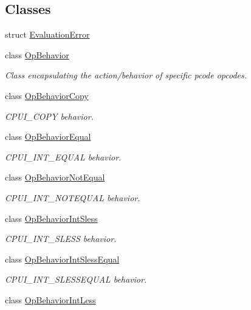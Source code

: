 \subsection*{Classes}
\begin{DoxyCompactItemize}
\item 
struct \mbox{\hyperlink{struct_evaluation_error}{Evaluation\+Error}}
\item 
class \mbox{\hyperlink{class_op_behavior}{Op\+Behavior}}
\begin{DoxyCompactList}\small\item\em Class encapsulating the action/behavior of specific pcode opcodes. \end{DoxyCompactList}\item 
class \mbox{\hyperlink{class_op_behavior_copy}{Op\+Behavior\+Copy}}
\begin{DoxyCompactList}\small\item\em C\+P\+U\+I\+\_\+\+C\+O\+PY behavior. \end{DoxyCompactList}\item 
class \mbox{\hyperlink{class_op_behavior_equal}{Op\+Behavior\+Equal}}
\begin{DoxyCompactList}\small\item\em C\+P\+U\+I\+\_\+\+I\+N\+T\+\_\+\+E\+Q\+U\+AL behavior. \end{DoxyCompactList}\item 
class \mbox{\hyperlink{class_op_behavior_not_equal}{Op\+Behavior\+Not\+Equal}}
\begin{DoxyCompactList}\small\item\em C\+P\+U\+I\+\_\+\+I\+N\+T\+\_\+\+N\+O\+T\+E\+Q\+U\+AL behavior. \end{DoxyCompactList}\item 
class \mbox{\hyperlink{class_op_behavior_int_sless}{Op\+Behavior\+Int\+Sless}}
\begin{DoxyCompactList}\small\item\em C\+P\+U\+I\+\_\+\+I\+N\+T\+\_\+\+S\+L\+E\+SS behavior. \end{DoxyCompactList}\item 
class \mbox{\hyperlink{class_op_behavior_int_sless_equal}{Op\+Behavior\+Int\+Sless\+Equal}}
\begin{DoxyCompactList}\small\item\em C\+P\+U\+I\+\_\+\+I\+N\+T\+\_\+\+S\+L\+E\+S\+S\+E\+Q\+U\+AL behavior. \end{DoxyCompactList}\item 
class \mbox{\hyperlink{class_op_behavior_int_less}{Op\+Behavior\+Int\+Less}}

\end{DoxyCompactItemize}
